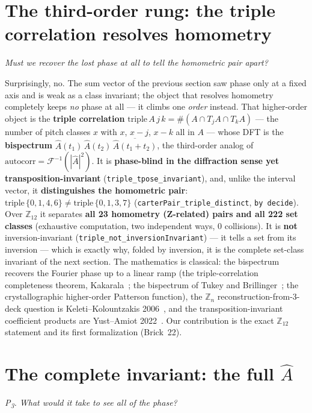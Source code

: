 \documentclass[11pt]{article}
\newcommand{\lean}[1]{\texttt{#1}}
\newcommand{\Ztwelve}{\mathbb{Z}_{12}}
\newcommand{\Zn}[1]{\mathbb{Z}_{#1}}
\newcommand{\Ahat}{\hat{A}}
\newcommand{\Fi}{\mathcal{F}^{-1}}
\newcommand{\question}[1]{\smallskip\noindent\textit{#1}\smallskip}
\begin{document}
\section{The third-order rung: the triple correlation resolves homometry}\label{sec:triple}

\question{Must we recover the lost phase at all to tell the homometric pair apart?}

\noindent Surprisingly, no. The sum vector of the previous section saw phase only at a fixed axis and is
weak as a class invariant; the object that resolves homometry completely keeps \emph{no} phase at all ---
it climbs one \emph{order} instead. That higher-order object is the \textbf{triple correlation}
$\mathrm{triple}\,A\,j\,k=\#(A\cap T_jA\cap T_kA)$ --- the number of pitch classes $x$ with $x$, $x-j$,
$x-k$ all in $A$ --- whose DFT is the \textbf{bispectrum}
$\Ahat(t_1)\,\Ahat(t_2)\,\overline{\Ahat(t_1+t_2)}$, the third-order analog of
$\mathrm{autocorr}=\Fi(|\Ahat|^2)$. It is \textbf{phase-blind in the diffraction sense yet
transposition-invariant} (\lean{triple\_tpose\_invariant}), and, unlike the interval vector, it
\textbf{distinguishes the homometric pair}: $\mathrm{triple}\,\{0,1,4,6\}\ne\mathrm{triple}\,\{0,1,3,7\}$
(\lean{carterPair\_triple\_distinct}, \lean{by decide}). Over $\Ztwelve$ it separates \textbf{all 23
homometry (Z-related) pairs and all 222 set classes} (exhaustive computation, two independent ways, $0$
collisions). It is \textbf{not} inversion-invariant (\lean{triple\_not\_inversionInvariant}) --- it tells a
set from its inversion --- which is exactly why, folded by inversion, it is the complete set-class invariant
of the next section. The mathematics is classical: the bispectrum recovers the Fourier phase up to a linear
ramp (the triple-correlation completeness theorem, Kakarala~\cite{Kakarala}; the bispectrum of Tukey and
Brillinger~\cite{Brillinger}; the crystallographic higher-order Patterson function), the $\Zn{n}$
reconstruction-from-3-deck question is Keleti--Kolountzakis 2006~\cite{KK}, and the transposition-invariant
coefficient products are Yust--Amiot 2022~\cite{YA}. Our contribution is the exact $\Ztwelve$ statement and its
first formalization (Brick~22).

\section{The complete invariant: the full \texorpdfstring{$\Ahat$}{A}}\label{sec:complete}

\question{P\textsubscript{3}. What would it take to see \emph{all} of the phase?}
\end{document}
